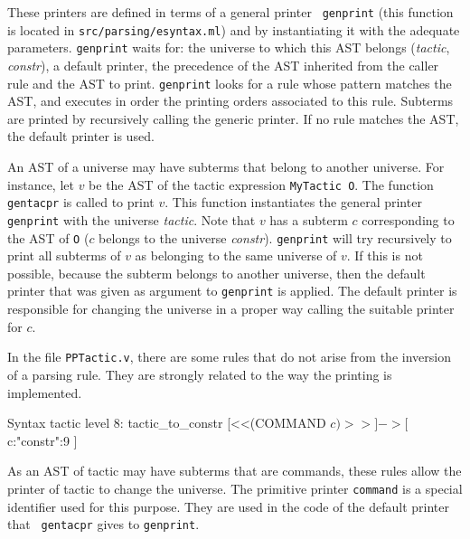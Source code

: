 These printers are defined in terms of a general printer {\tt
genprint} (this function is located in {\tt src/parsing/esyntax.ml})
and by instantiating it with the adequate parameters. {\tt genprint}
waits for: the universe to which this AST belongs ({\it tactic}, {\it
constr}), a default printer, the precedence of the AST inherited from
the caller rule and the AST to print. {\tt genprint} looks for a rule
whose pattern matches the AST, and executes in order the printing
orders associated to this rule. Subterms are printed by recursively
calling the generic printer. If no rule matches the AST, the default
printer is used.

An AST of a universe may have subterms that belong to another
universe. For instance, let $v$ be the AST of the tactic
expression \verb+MyTactic O+. The function {\tt gentacpr} is called
to print $v$.  This function instantiates the general printer {\tt
genprint} with the universe {\it tactic}. Note that $v$ has a subterm
$c$ corresponding to the AST of \verb+O+ ($c$ belongs to the universe
{\it constr}).  {\tt genprint} will try recursively to print all
subterms of $v$ as belonging to the same universe of $v$. If this is
not possible, because the subterm belongs to another universe, then
the default printer that was given as argument to {\tt genprint} is
applied. The default printer is responsible for changing the universe
in a proper way calling the suitable printer for $c$.

\medskip{} In the file
\verb+PPTactic.v+, there are some rules that do not arise from the
inversion of a parsing rule. They are strongly related to the way the
printing is implemented.

\begin{coq_example*}
Syntax tactic level 8:
    tactic_to_constr [<<(COMMAND $c)>>] -> [ $c:"constr":9 ]
\end{coq_example*}

As an AST of tactic may have subterms that are commands, these rules
allow the printer of tactic to change the universe. The primitive printer
{\tt command} is a special identifier used for this
purpose. They are used in the code of the default printer that {\tt
gentacpr} gives to {\tt genprint}.
\fi


